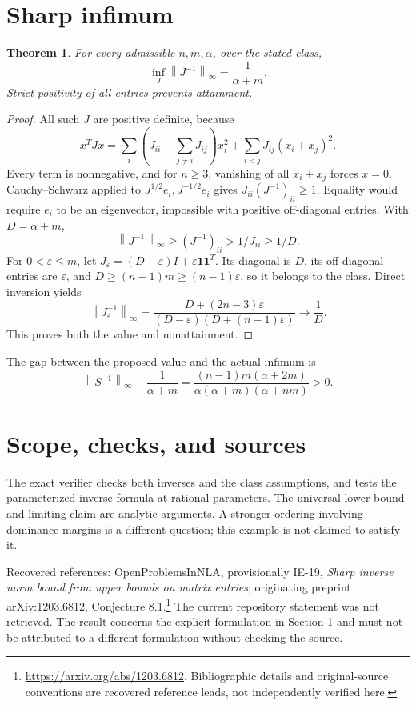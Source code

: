 \documentclass[11pt]{article}
\newtheorem{theorem}{Theorem}
\newcommand{\norm}[1]{\left\lVert#1\right\rVert}
\newcommand{\one}{\boldsymbol 1}
\begin{document}
\section{Sharp infimum}
\begin{theorem}
For every admissible $n,m,\alpha$, over the stated class,
\[\boxed{\inf_J\norm{J^{-1}}_\infty=\frac1{\alpha+m}.}\]
Strict positivity of all entries prevents attainment.
\end{theorem}
\begin{proof}
All such $J$ are positive definite, because
\[
x^TJx=\sum_i\left(J_{ii}-\sum_{j\ne i}J_{ij}\right)x_i^2
+\sum_{i<j}J_{ij}(x_i+x_j)^2.
\]
Every term is nonnegative, and for $n\ge3$, vanishing of all $x_i+x_j$ forces $x=0$. Cauchy--Schwarz applied to $J^{1/2}e_i,J^{-1/2}e_i$ gives $J_{ii}(J^{-1})_{ii}\ge1$. Equality would require $e_i$ to be an eigenvector, impossible with positive off-diagonal entries. With $D=\alpha+m$,
\[
\norm{J^{-1}}_\infty\ge(J^{-1})_{ii}>1/J_{ii}\ge1/D.
\]
For $0<\varepsilon\le m$, let $J_\varepsilon=(D-\varepsilon)I+\varepsilon\one\one^T$. Its diagonal is $D$, its off-diagonal entries are $\varepsilon$, and $D\ge(n-1)m\ge(n-1)\varepsilon$, so it belongs to the class. Direct inversion yields
\[
\norm{J_\varepsilon^{-1}}_\infty=
\frac{D+(2n-3)\varepsilon}{(D-\varepsilon)(D+(n-1)\varepsilon)}\longrightarrow\frac1D.
\]
This proves both the value and nonattainment.
\end{proof}
The gap between the proposed value and the actual infimum is
\[
\norm{S^{-1}}_\infty-\frac1{\alpha+m}
=\frac{(n-1)m(\alpha+2m)}{\alpha(\alpha+m)(\alpha+nm)}>0.
\]
\section{Scope, checks, and sources}
The exact verifier checks both inverses and the class assumptions, and tests the parameterized inverse formula at rational parameters. The universal lower bound and limiting claim are analytic arguments. A stronger ordering involving dominance margins is a different question; this example is not claimed to satisfy it.

Recovered references: OpenProblemsInNLA, provisionally IE-19, \emph{Sharp inverse norm bound from upper bounds on matrix entries}; originating preprint arXiv:1203.6812, Conjecture 8.1.\footnote{\url{https://arxiv.org/abs/1203.6812}. Bibliographic details and original-source conventions are recovered reference leads, not independently verified here.} The current repository statement was not retrieved. The result concerns the explicit formulation in Section 1 and must not be attributed to a different formulation without checking the source.
\end{document}
